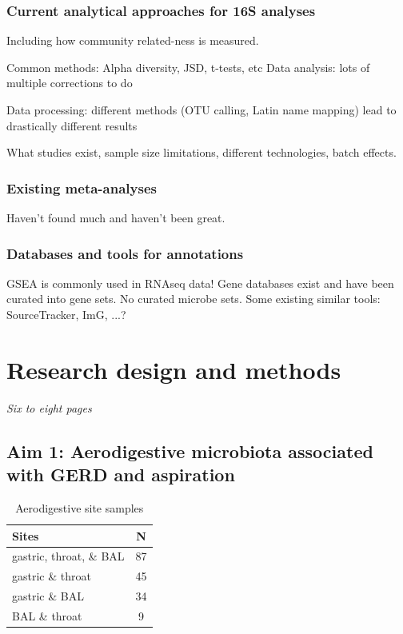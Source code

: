 \documentclass[12pt]{article}
\begin{document}
\subsubsection{Current analytical approaches for 16S analyses}
Including how community related-ness is measured.

Common methods: Alpha diversity, JSD, t-tests, etc
Data analysis: lots of multiple corrections to do

Data processing: different methods (OTU calling, Latin name mapping) lead to drastically different results

What studies exist, sample size limitations, different technologies, batch effects.

\subsubsection{Existing meta-analyses}
Haven't found much and haven't been great.

\subsubsection{Databases and tools for annotations}
GSEA is commonly used in RNAseq data! Gene databases exist and have been curated into gene sets.
No curated microbe sets. Some existing similar tools: SourceTracker, ImG, ...?

\section{Research design and methods}
\textit{Six to eight pages}

\subsection{Aim 1: Aerodigestive microbiota associated with GERD and aspiration}

\begin{table}
\begin{tabular}{|l|c|}
	\hline
	\textbf{Sites} & \textbf{N} \\
	\hline
	gastric, throat, \& BAL & 87 \\
	gastric \& throat & 45 \\
	gastric \& BAL & 34 \\
	BAL \& throat & 9 \\
	\hline 
\end{tabular}
\caption{Aerodigestive site samples}\label{tab:rosen_samples}
\end{table}
\end{document}
